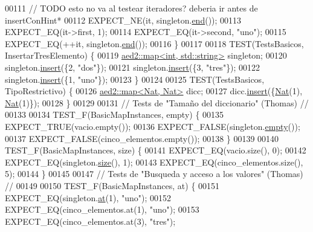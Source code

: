 \begin{DoxyCode}
00111     \textcolor{comment}{// TODO esto no va al testear iteradores? deberia ir antes de insertConHint*}
00112     EXPECT\_NE(it, singleton.\hyperlink{classaed2_1_1map_a76023e6a56cb625513e1b5ea028bf983_a76023e6a56cb625513e1b5ea028bf983}{end}());
00113     EXPECT\_EQ(it->first, 1);
00114     EXPECT\_EQ(it->second, \textcolor{stringliteral}{"uno"});
00115     EXPECT\_EQ(++it, singleton.\hyperlink{classaed2_1_1map_a76023e6a56cb625513e1b5ea028bf983_a76023e6a56cb625513e1b5ea028bf983}{end}());
00116 \}
00117 
00118 TEST(TestsBasicos, InsertarTresElemento) \{
00119     \hyperlink{classaed2_1_1map}{aed2::map<int, std::string>} singleton;
00120     singleton.\hyperlink{classaed2_1_1map_a60aacba06b1579630b3c8e996cf248c8_a60aacba06b1579630b3c8e996cf248c8}{insert}(\{2, \textcolor{stringliteral}{"dos"}\});
00121     singleton.\hyperlink{classaed2_1_1map_a60aacba06b1579630b3c8e996cf248c8_a60aacba06b1579630b3c8e996cf248c8}{insert}(\{3, \textcolor{stringliteral}{"tres"}\});
00122     singleton.\hyperlink{classaed2_1_1map_a60aacba06b1579630b3c8e996cf248c8_a60aacba06b1579630b3c8e996cf248c8}{insert}(\{1, \textcolor{stringliteral}{"uno"}\});
00123 \}
00124 
00125 TEST(TestsBasicos, TipoRestrictivo) \{
00126     \hyperlink{classaed2_1_1map}{aed2::map<Nat, Nat>} dicc;
00127     dicc.\hyperlink{classaed2_1_1map_a60aacba06b1579630b3c8e996cf248c8_a60aacba06b1579630b3c8e996cf248c8}{insert}(\{\hyperlink{classNat}{Nat}(1), \hyperlink{classNat}{Nat}(1)\});
00128 \}
00129 
00131 \textcolor{comment}{// Tests de "Tamaño del diccionario" (Thomas) //}
00133 \textcolor{comment}{}
00134 TEST\_F(BasicMapInstances, empty) \{
00135     EXPECT\_TRUE(vacio.empty());
00136     EXPECT\_FALSE(singleton.\hyperlink{classaed2_1_1map_a0dcb39283f4877ae59cb756ed1d0c048_a0dcb39283f4877ae59cb756ed1d0c048}{empty}());
00137     EXPECT\_FALSE(cinco\_elementos.empty());
00138 \}
00139 
00140 TEST\_F(BasicMapInstances, size) \{
00141     EXPECT\_EQ(vacio.size(), 0);
00142     EXPECT\_EQ(singleton.\hyperlink{classaed2_1_1map_aa6e806b3be6dc0da79adbfae08b571bf_aa6e806b3be6dc0da79adbfae08b571bf}{size}(), 1);
00143     EXPECT\_EQ(cinco\_elementos.size(), 5);
00144 \}
00145 
00147 \textcolor{comment}{// Tests de "Busqueda y acceso a los valores" (Thomas) //}
00149 \textcolor{comment}{}
00150 TEST\_F(BasicMapInstances, at) \{
00151     EXPECT\_EQ(singleton.\hyperlink{classaed2_1_1map_a579c9179b42175c23a1013ac7f1b876c_a579c9179b42175c23a1013ac7f1b876c}{at}(1), \textcolor{stringliteral}{"uno"});
00152     EXPECT\_EQ(cinco\_elementos.at(1), \textcolor{stringliteral}{"uno"});
00153     EXPECT\_EQ(cinco\_elementos.at(3), \textcolor{stringliteral}{"tres"});

\end{DoxyCode}
